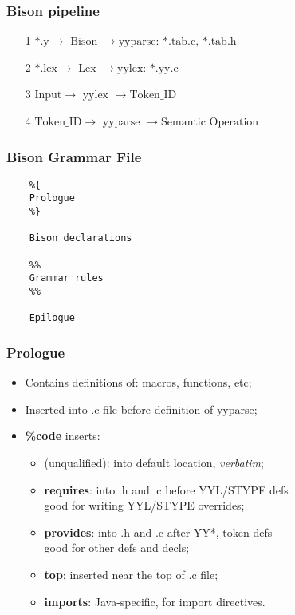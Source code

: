 \documentclass[14pt]{beamer}
\begin{document}
\begin{frame}[fragile]
	\frametitle{Bison pipeline}
	\begin{itemize}
		\item[1] $ \text{*.y} \rightarrow \boxed{\text{ Bison }} \rightarrow \text{yyparse: *.tab.c, *.tab.h} $
		\item[2] $ \text{*.lex} \rightarrow \boxed{\text{ Lex }} \rightarrow \text{yylex: *.yy.c} $
		\item[3] $ \text{Input} \rightarrow \boxed{\text{ yylex }} \rightarrow \text{Token\_ID} $
		\item[4] $ \text{Token\_ID} \rightarrow \boxed{\text{ yyparse }} \rightarrow \text{Semantic Operation} $
	\end{itemize}
	
\end{frame}

\begin{frame}[fragile]
	
	\frametitle{Bison Grammar File}	
	
\begin{lstlisting}
	%{
	Prologue
	%}
	
	Bison declarations
	
	%%
	Grammar rules
	%%
	
	Epilogue
\end{lstlisting}

\end{frame}

\begin{frame}[fragile]
	
	\frametitle{Prologue}	
	
\begin{itemize}
	\item Contains definitions of: macros, functions, etc;
	\item Inserted into .c file before definition of yyparse;
	\item \textbf{\%code} inserts: \begin{itemize}
		\item (unqualified): into default location, \textit{verbatim};
		\item \textbf{requires}: into .h and .c before YYL/STYPE defs \\ good for writing YYL/STYPE overrides;
		\item \textbf{provides}: into .h and .c after YY*, token defs \\ good for other defs and decls;
		\item \textbf{top}: inserted near the top of .c file;
		\item \textbf{imports}: Java-specific, for import directives.
	\end{itemize}
\end{itemize}
	
\end{frame}
\end{document}
